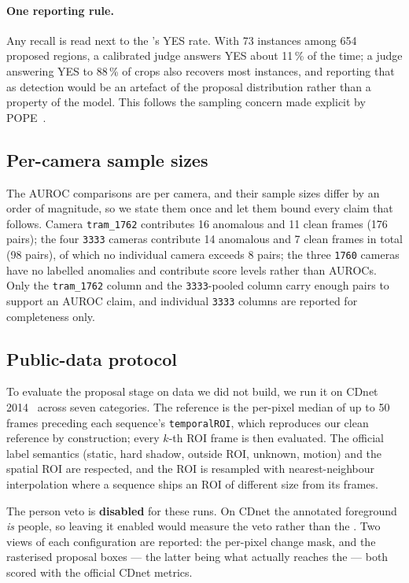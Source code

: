 \paragraph{One reporting rule.} Any recall is read next to the \judge{}'s YES
rate. With 73 instances among 654 proposed regions, a calibrated judge answers
YES about 11\,\% of the time; a judge answering YES to 88\,\% of crops also
recovers most instances, and reporting that as detection would be an artefact
of the proposal distribution rather than a property of the model. This follows
the sampling concern made explicit by POPE~\cite{Li_2023}.

\subsection{Per-camera sample sizes}
\label{sec:setup:sizes}

The AUROC comparisons are per camera, and their sample sizes differ by an
order of magnitude, so we state them once and let them bound every claim that
follows. Camera \texttt{tram\_1762} contributes 16 anomalous and 11 clean
frames (176 pairs); the four \texttt{3333} cameras contribute 14 anomalous and
7 clean frames in total (98 pairs), of which no individual camera exceeds 8
pairs; the three \texttt{1760} cameras have no labelled anomalies and
contribute score levels rather than AUROCs. Only the \texttt{tram\_1762}
column and the \texttt{3333}-pooled column carry enough pairs to support an
AUROC claim, and individual \texttt{3333} columns are reported for completeness
only.

\subsection{Public-data protocol}
\label{sec:setup:cdnet}

To evaluate the proposal stage on data we did not build, we run it on CDnet
2014~\cite{Wang_2014} across seven categories. The reference is the per-pixel
median of up to 50 frames preceding each sequence's \texttt{temporalROI},
which reproduces our clean reference by construction; every $k$-th ROI frame is
then evaluated. The official label semantics (static, hard shadow, outside ROI,
unknown, motion) and the spatial ROI are respected, and the ROI is resampled
with nearest-neighbour interpolation where a sequence ships an ROI of different
size from its frames.

The person veto is \textbf{disabled} for these runs. On CDnet the annotated
foreground \emph{is} people, so leaving it enabled would measure the veto
rather than the \proposer{}. Two views of each configuration are reported: the
per-pixel change mask, and the rasterised proposal boxes --- the latter being
what actually reaches the \judge{} --- both scored with the official CDnet
metrics.

